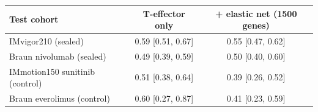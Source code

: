 \begin{tabular}{lcc}
\toprule
Test cohort & T-effector only & + elastic net (1500 genes) \\
\midrule
IMvigor210 (sealed) & 0.59 [0.51, 0.67] & 0.55 [0.47, 0.62] \\
Braun nivolumab (sealed) & 0.49 [0.39, 0.59] & 0.50 [0.40, 0.60] \\
IMmotion150 sunitinib (control) & 0.51 [0.38, 0.64] & 0.39 [0.26, 0.52] \\
Braun everolimus (control) & 0.60 [0.27, 0.87] & 0.41 [0.23, 0.59] \\
\bottomrule
\end{tabular}
